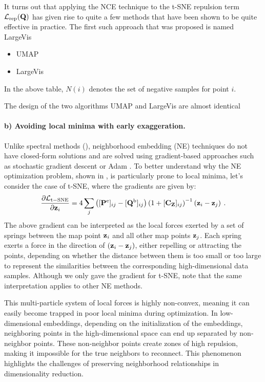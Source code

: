 It turns out that applying the NCE technique to the t-SNE repulsion term $\mathcal{L}_{\mathrm{rep}}({\mathbf{Q}})$ has given rise to quite a few methods that have been shown to be quite effective in practice. The first such approach that was proposed is named LargeVis \citep{tang2016visualizing}

\begin{itemize}
    \item UMAP
    \item LargeVis
\end{itemize}

In the above table, \(N(i)\) denotes the set of negative samples for point \(i\).

The design of the two algorithms UMAP and LargeVis are almost identical

\paragraph{b) Avoiding local minima with early exaggeration.} Unlike spectral methods (), neighborhood embedding (NE) techniques do not have closed-form solutions and are solved using gradient-based approaches such as stochastic gradient descent or Adam \citep{kingma2014adam}. To better understand why the NE optimization problem, shown in , is particularly prone to local minima, let's consider the case of t-SNE, where the gradients are given by:
\begin{align}
    \frac{\partial \mathcal{L}_{\mathrm{t-SNE}}}{\partial {\mathbf{z}}_i} = 4 \sum_j \left( [{\mathbf{P}}^{\mathrm{e}}]_{ij} - [{\mathbf{Q}}^{\mathrm{b}}]_{ij} \right) \left(1 + [\mathbf{C}_{{\mathbf{Z}}}]_{ij}\right)^{-1} \left( {\mathbf{z}}_i - {\mathbf{z}}_j \right) \:.
\end{align}
The above gradient can be interpreted as the local forces exerted by a set of springs between the map point ${\mathbf{z}}_i$ and all other map points ${\mathbf{z}}_j$. Each spring exerts a force in the direction of $({\mathbf{z}}_i - {\mathbf{z}}_j)$, either repelling or attracting the points, depending on whether the distance between them is too small or too large to represent the similarities between the corresponding high-dimensional data samples. Although we only gave the gradient for t-SNE, note that the same interpretation applies to other NE methods.

This multi-particle system of local forces is highly non-convex, meaning it can easily become trapped in poor local minima during optimization. In low-dimensional embeddings, depending on the initialization of the embeddings, neighboring points in the high-dimensional space can end up separated by non-neighbor points. These non-neighbor points create zones of high repulsion, making it impossible for the true neighbors to reconnect. This phenomenon highlights the challenges of preserving neighborhood relationships in dimensionality reduction. 

